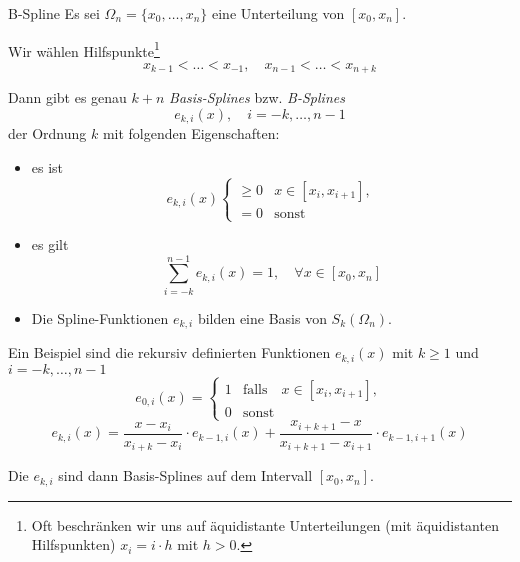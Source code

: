 \begin{defi}{B-Spline}
    Es sei $\Omega_n = \{ x_0, \ldots, x_n \}$ eine Unterteilung von $[x_0, x_n]$.
    
    Wir wählen Hilfspunkte\footnote{Oft beschränken wir uns auf äquidistante Unterteilungen (mit äquidistanten Hilfspunkten) $x_i = i \cdot h$ mit $h > 0$.}
    \[ 
        x_{k-1} < \ldots < x_{-1}, \quad x_{n-1} < \ldots < x_{n + k}
    \]
    
    Dann gibt es genau $k + n$ \emph{Basis-Splines} bzw. \emph{B-Splines}
    \[
        e_{k, i}(x), \quad i = -k, \ldots, n-1    
    \]
    der Ordnung $k$ mit folgenden Eigenschaften: 
    \begin{itemize}
        \item es ist
              \[ 
                  e_{k, i}(x) 
                  \begin{cases}
                      \geq 0 & x \in [x_i, x_{i+1}], \\
                      = 0    & \text{sonst}
                  \end{cases}
              \]
        \item es gilt
              \[ 
                  \sum_{i = -k}^{n-1} e_{k, i}(x) = 1, \quad \forall x \in [x_0, x_n]
              \]
        \item Die Spline-Funktionen $e_{k, i}$ bilden eine Basis von $S_k(\Omega_n)$.
    \end{itemize}
    
    Ein Beispiel sind die rekursiv definierten Funktionen $e_{k, i}(x)$ mit $k \geq 1$ und $i = -k, \ldots, n-1$
    \[ 
        e_{0, i}(x) = 
        \begin{cases}
            1 & \text{falls} \quad x \in [x_i, x_{i+1}], \\
            0 & \text{sonst}
        \end{cases}
    \]
    \[ 
        e_{k, i}(x) = \frac{x - x_i}{x_{i+k} - x_i} \cdot e_{k-1, i}(x) + \frac{x_{i+k+1} - x}{x_{i+k+1} - x_{i+1}} \cdot e_{k-1, i+1}(x)
    \]
    
    Die $e_{k, i}$ sind dann Basis-Splines auf dem Intervall $[x_0, x_n]$.
\end{defi}


